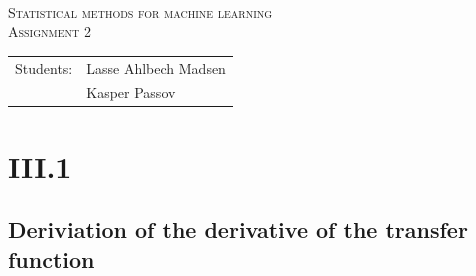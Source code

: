 \documentclass{article}
\begin{document}
\begin{titlepage}
\begin{center}
    \hline \\[0.2cm]
\textsc{\Large Statistical methods for machine learning}\\[0.5cm]
\textsc{\large Assignment 2}\\[0.5cm]
    \hline
    \hline
\vspace{2 cm}
\begin{tabular}{ll}
Students: & Lasse Ahlbech Madsen \\
          & Kasper Passov\\
\end{tabular}
\end{center}
\vspace{5 cm}
\newpage
\end{titlepage}

\section{III.1}

\subsection{Deriviation of the derivative of the transfer function}

\subsection{}
\end{document}
